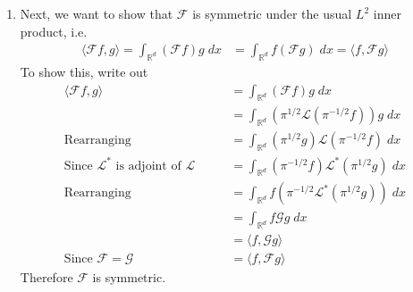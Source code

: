 \documentclass[12pt]{article}
\theoremstyle{plain}
\theoremstyle{definition}
\theoremstyle{remark}
\begin{document}
\begin{enumerate}
\begin{enumerate}
      \item %
        Next, we want to show that $\mathscr{F}$ is symmetric under the
        usual $L^2$ inner product, i.e.
        \begin{align*}
          \langle \mathscr{F}f, g\rangle
            =\int_{\mathbb{R}^d} (\mathscr{F}f) g \; dx
          &=
            \int_{\mathbb{R}^d} f (\mathscr{F}g) \; dx
            =\langle f, \mathscr{F}g\rangle
        \end{align*}
        To show this, write out
        \begin{align*}
          \langle \mathscr{F}f, g\rangle
            &=\int_{\mathbb{R}^d} (\mathscr{F}f) g \; dx\\
            &=\int_{\mathbb{R}^d} \left( \pi^{1/2} \mathscr{L}( \pi^{-1/2} f)\right) g \; dx\\
            \text{Rearranging} \qquad
            &=\int_{\mathbb{R}^d}  (\pi^{1/2} g) \mathscr{L} \left(\pi^{-1/2} f\right)  \; dx\\
            \text{Since $\mathscr{L}^*$ is adjoint of $\mathscr{L}$} \qquad
            &=\int_{\mathbb{R}^d} \left(\pi^{-1/2} f\right) \mathscr{L^*} (\pi^{1/2} g)   \; dx\\
            \text{Rearranging} \qquad
            &=\int_{\mathbb{R}^d}  f \left(\pi^{-1/2} \mathscr{L^*} (\pi^{1/2} g) \right)  \; dx\\
            &=\int_{\mathbb{R}^d}  f \mathscr{G}g   \; dx\\
            &= \langle f, \mathscr{G}g\rangle\\
            \text{Since $\mathscr{F}=\mathscr{G}$}\qquad
            &= \langle f, \mathscr{F}g \rangle
        \end{align*}
        Therefore $\mathscr{F}$ is symmetric.
    \end{enumerate}


\end{enumerate}
\end{document}
